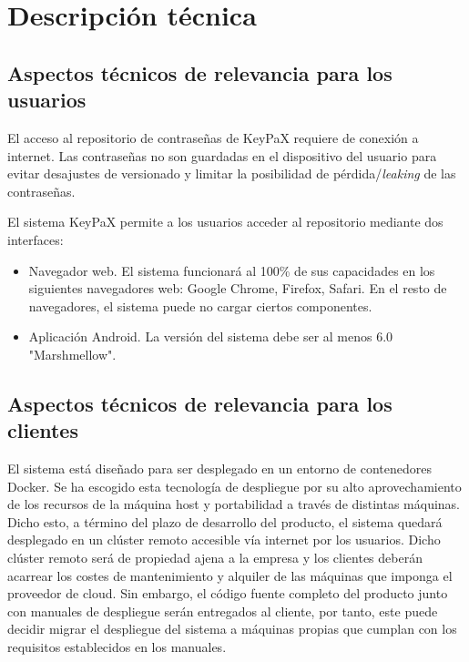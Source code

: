 \documentclass{article}
\begin{document}
\pagebreak

\section{Descripción técnica}

\subsection{Aspectos técnicos de relevancia para los usuarios}

El acceso al repositorio de contraseñas de KeyPaX requiere de conexión a internet. Las contraseñas no son guardadas en el dispositivo del usuario para evitar desajustes de versionado y limitar la posibilidad de pérdida/\textit{leaking} de las contraseñas.

El sistema KeyPaX permite a los usuarios acceder al repositorio mediante dos interfaces:
\begin{itemize}
    \setlength\itemsep{0em}
    \item Navegador web. El sistema funcionará al 100\% de sus capacidades en los siguientes navegadores web: Google Chrome, Firefox, Safari. En el resto de navegadores, el sistema puede no cargar ciertos componentes.
    \item Aplicación Android. La versión del sistema debe ser al menos 6.0 "Marshmellow".
\end{itemize}

\subsection{Aspectos técnicos de relevancia para los clientes}

El sistema está diseñado para ser desplegado en un entorno de contenedores Docker.
Se ha escogido esta tecnología de despliegue por su alto aprovechamiento de los recursos de la máquina host y portabilidad a través de distintas máquinas.
Dicho esto, a término del plazo de desarrollo del producto, el sistema quedará desplegado en un clúster remoto accesible vía internet por los usuarios. Dicho clúster remoto será de propiedad ajena a la empresa y los clientes deberán acarrear los costes de mantenimiento y alquiler de las máquinas que imponga el proveedor de cloud.
Sin embargo, el código fuente completo del producto junto con manuales de despliegue serán entregados al cliente, por tanto, este puede decidir migrar el despliegue del sistema a máquinas propias que cumplan con los requisitos establecidos en los manuales.
\end{document}
